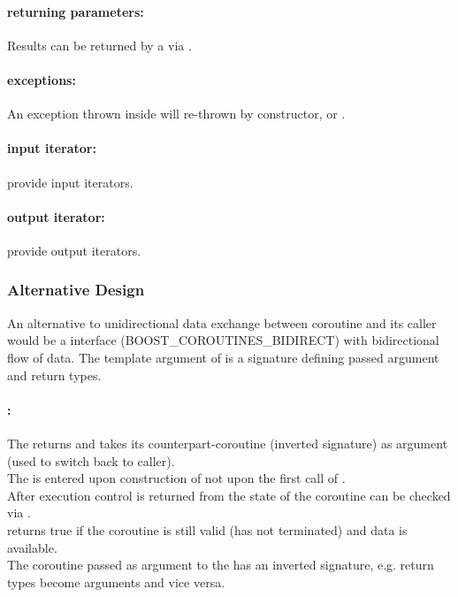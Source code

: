 \paragraph*{returning parameters:}
Results can be returned by a \corofunction via \pushcoroop.\\

\paragraph*{exceptions:}
An exception thrown inside \corofunction will re-thrown by \pullcoro
constructor, \pullcoroop or \pushcoroop.

\paragraph*{input iterator:}
\pullcoro provide input iterators.

\paragraph*{output iterator:}
\pushcoro provide output iterators.


\subsubsection*{Alternative Design}
An alternative to unidirectional data exchange between coroutine and its caller
would be a interface (BOOST\_COROUTINES\_BIDIRECT) with bidirectional flow of
data. The template argument of \coro is a signature defining passed argument and
return types.

\paragraph*{\corofunction:}
The \corofunction returns  and takes its counterpart-coroutine
(inverted signature) as argument (used to switch back to caller).\\
The \corofunction is entered upon construction of \coro not upon the first call of
\coroop.\\
After execution control is returned from \corofunction the state of the
coroutine can be checked via \corobool.\\
\corobool returns true if the coroutine is still valid (\corofunction has not
terminated) and data is available.\\
The coroutine passed as argument to the \corofunction has an inverted
signature, e.g. return types become arguments and vice versa.


